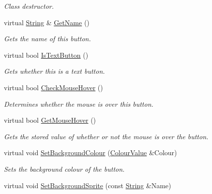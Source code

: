 \begin{DoxyCompactItemize}
\begin{DoxyCompactList}\small\item\em Class destructor. \item\end{DoxyCompactList}\item 
virtual \hyperlink{namespacephys_aa03900411993de7fbfec4789bc1d392e}{String} \& \hyperlink{classphys_1_1UI_1_1Button_a366ba1ddf5064cafdfae63457472b2a2}{GetName} ()
\begin{DoxyCompactList}\small\item\em Gets the name of this button. \item\end{DoxyCompactList}\item 
virtual bool \hyperlink{classphys_1_1UI_1_1Button_a920cfc9d4daa7d53de2ed051ed52d977}{IsTextButton} ()
\begin{DoxyCompactList}\small\item\em Gets whether this is a text button. \item\end{DoxyCompactList}\item 
virtual bool \hyperlink{classphys_1_1UI_1_1Button_a72d76501d15053e3fbd9e7eb933e22de}{CheckMouseHover} ()
\begin{DoxyCompactList}\small\item\em Determines whether the mouse is over this button. \item\end{DoxyCompactList}\item 
virtual bool \hyperlink{classphys_1_1UI_1_1Button_a66522ebf5f3c75e96a6dfd99700a0f74}{GetMouseHover} ()
\begin{DoxyCompactList}\small\item\em Gets the stored value of whether or not the mouse is over the button. \item\end{DoxyCompactList}\item 
virtual void \hyperlink{classphys_1_1UI_1_1Button_ac4ce81ec9cdc97ac3d29aed5031c5ac6}{SetBackgroundColour} (\hyperlink{classphys_1_1ColourValue}{ColourValue} \&Colour)
\begin{DoxyCompactList}\small\item\em Sets the background colour of the button. \item\end{DoxyCompactList}\item 
virtual void \hyperlink{classphys_1_1UI_1_1Button_a7cecb219a59fb55db6ac0070359bb23f}{SetBackgroundSprite} (const \hyperlink{namespacephys_aa03900411993de7fbfec4789bc1d392e}{String} \&Name)

\end{DoxyCompactItemize}
